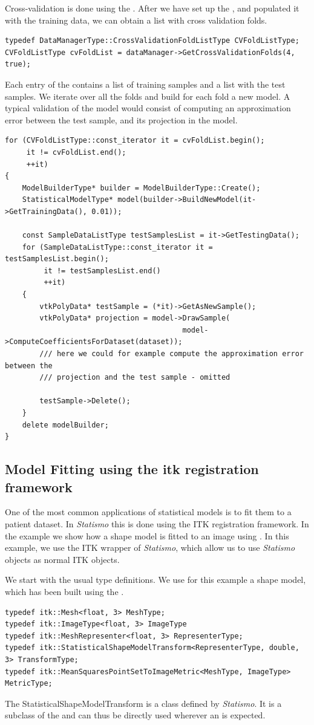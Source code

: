 \documentclass{InsightArticle}
\newcommand{\Statismo}{\emph{Statismo}\xspace}
\begin{document}
Cross-validation is done using the . 
After we have set up the , and populated it with the training data, we 
can obtain a list with cross validation folds. 
\begin{verbatim}
typedef DataManagerType::CrossValidationFoldListType CVFoldListType;
CVFoldListType cvFoldList = dataManager->GetCrossValidationFolds(4, true);
\end{verbatim}
Each entry of the  contains a list of training samples and a list with the test samples. 
We iterate over all the folds and build for each fold a new model. A typical validation of the model would 
consist of computing an approximation error between the test sample, and its projection in the model. 
\begin{verbatim}
for (CVFoldListType::const_iterator it = cvFoldList.begin();
     it != cvFoldList.end();
     ++it)
{
    ModelBuilderType* builder = ModelBuilderType::Create();
    StatisticalModelType* model(builder->BuildNewModel(it->GetTrainingData(), 0.01));

    const SampleDataListType testSamplesList = it->GetTestingData();
    for (SampleDataListType::const_iterator it = testSamplesList.begin();
         it != testSamplesList.end()
         ++it)
    {
        vtkPolyData* testSample = (*it)->GetAsNewSample();
        vtkPolyData* projection = model->DrawSample(
                                         model->ComputeCoefficientsForDataset(dataset));
        /// here we could for example compute the approximation error between the 
        /// projection and the test sample - omitted

        testSample->Delete();
    }
    delete modelBuilder;
}

\end{verbatim}

\subsection{Model Fitting using the itk registration framework}\label{sec:model-fitting}
One of the most common applications of statistical models is to fit them to a patient dataset. 
In \Statismo this is done using the ITK registration framework. In the example 
we show how a shape model is fitted to an image using . 
In this example, we use the ITK wrapper of \Statismo, which allow us to use \Statismo objects as normal ITK objects.

We start with the usual type definitions. We use for this example a shape model, which has been 
built using the . 
\begin{verbatim}
typedef itk::Mesh<float, 3> MeshType;
typedef itk::ImageType<float, 3> ImageType
typedef itk::MeshRepresenter<float, 3> RepresenterType;
typedef itk::StatisticalShapeModelTransform<RepresenterType, double, 3> TransformType;
typedef itk::MeanSquaresPointSetToImageMetric<MeshType, ImageType> MetricType;
\end{verbatim}
The StatisticalShapeModelTransform is a class defined by \Statismo. It is a subclass of the 
and can thus be directly used wherever an  is expected. 
\end{document}
